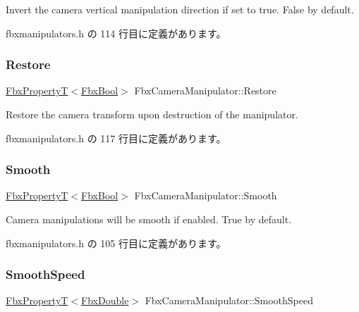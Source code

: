 Invert the camera vertical manipulation direction if set to true. False by default. 

 fbxmanipulators.\+h の 114 行目に定義があります。

\mbox{\label{class_fbx_camera_manipulator_aafe0b0e43ecaf16a44a49ae2d55f440a}} 
\subsubsection{\texorpdfstring{Restore}{Restore}}
{\footnotesize\ttfamily \hyperlink{class_fbx_property_t}{Fbx\+PropertyT}$<$\hyperlink{fbxtypes_8h_a92e0562b2fe33e76a242f498b362262e}{Fbx\+Bool}$>$ Fbx\+Camera\+Manipulator\+::\+Restore}

Restore the camera transform upon destruction of the manipulator. 

 fbxmanipulators.\+h の 117 行目に定義があります。

\mbox{\label{class_fbx_camera_manipulator_abdefaf7c5fef50e2c873616099c2a579}} 
\subsubsection{\texorpdfstring{Smooth}{Smooth}}
{\footnotesize\ttfamily \hyperlink{class_fbx_property_t}{Fbx\+PropertyT}$<$\hyperlink{fbxtypes_8h_a92e0562b2fe33e76a242f498b362262e}{Fbx\+Bool}$>$ Fbx\+Camera\+Manipulator\+::\+Smooth}

Camera manipulations will be smooth if enabled. True by default. 

 fbxmanipulators.\+h の 105 行目に定義があります。

\mbox{\label{class_fbx_camera_manipulator_afa0edcbcd8ad9a4de15672c7e8fc0c3d}} 
\subsubsection{\texorpdfstring{Smooth\+Speed}{SmoothSpeed}}
{\footnotesize\ttfamily \hyperlink{class_fbx_property_t}{Fbx\+PropertyT}$<$\hyperlink{fbxtypes_8h_a171e72a1c46fc15c1a6c9c31948c1c5b}{Fbx\+Double}$>$ Fbx\+Camera\+Manipulator\+::\+Smooth\+Speed}

